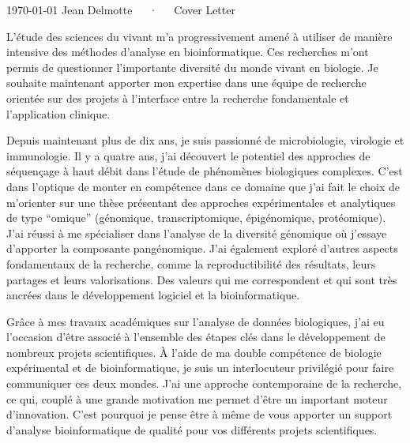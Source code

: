 \documentclass[11pt, a4paper]{awesome-cv}
\begin{document}
\makecvheader[R]

\makecvfooter
  {\today}
  {Jean Delmotte~~~·~~~Cover Letter}
  {\thepage}
\makelettertitle

\begin{cvletter}

L’étude des sciences du vivant m’a progressivement amené à utiliser de manière intensive des méthodes d’analyse en bioinformatique. Ces recherches m’ont permis de questionner l’importante diversité du monde vivant en biologie. Je souhaite maintenant apporter mon expertise dans une équipe de recherche orientée sur des projets à l’interface entre la recherche fondamentale et l’application clinique.

Depuis maintenant plus de dix ans, je suis passionné de microbiologie, virologie et immunologie. Il y a quatre ans, j’ai découvert le potentiel des approches de séquençage à haut débit dans l’étude de phénomènes biologiques complexes. C’est dans l’optique de monter en compétence dans ce domaine que j’ai fait le choix de m’orienter sur une thèse présentant des approches expérimentales et analytiques de type “omique” (génomique, transcriptomique, épigénomique, protéomique). J’ai réussi à me spécialiser dans l’analyse de la diversité génomique où j’essaye d’apporter la composante pangénomique. J'ai également exploré d'autres aspects fondamentaux de la recherche, comme la reproductibilité des résultats, leurs partages et leurs valorisations. Des valeurs qui me correspondent et qui sont très ancrées dans le développement logiciel et la bioinformatique.

Grâce à mes travaux académiques sur l’analyse de données biologiques, j’ai eu l’occasion d’être associé à l'ensemble des étapes clés dans le développement de nombreux projets scientifiques. À l’aide de ma double compétence de biologie expérimental et de bioinformatique, je suis un interlocuteur privilégié pour faire communiquer ces deux mondes. J'ai une approche contemporaine de la recherche, ce qui, couplé à une grande motivation me permet d’être un important moteur d’innovation. C'est pourquoi je pense être à même de vous apporter un support d’analyse bioinformatique de qualité pour vos différents projets scientifiques.

\end{cvletter}


\makeletterclosing
\end{document}
